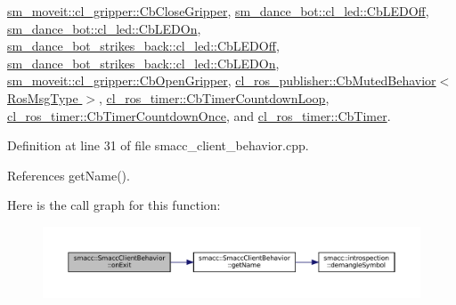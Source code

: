 \hyperlink{classsm__moveit_1_1cl__gripper_1_1CbCloseGripper_a643cca41b7a62a3c2b26e07ab7edb05a}{sm\+\_\+moveit\+::cl\+\_\+gripper\+::\+Cb\+Close\+Gripper}, \hyperlink{classsm__dance__bot_1_1cl__led_1_1CbLEDOff_ad0db28985308dd486943d1f511c655ad}{sm\+\_\+dance\+\_\+bot\+::cl\+\_\+led\+::\+Cb\+L\+E\+D\+Off}, \hyperlink{classsm__dance__bot_1_1cl__led_1_1CbLEDOn_a60a82058c585b4d0398b531c1e1bdf0b}{sm\+\_\+dance\+\_\+bot\+::cl\+\_\+led\+::\+Cb\+L\+E\+D\+On}, \hyperlink{classsm__dance__bot__strikes__back_1_1cl__led_1_1CbLEDOff_a6b4ac6e1c516ced8515e6b6641c5d063}{sm\+\_\+dance\+\_\+bot\+\_\+strikes\+\_\+back\+::cl\+\_\+led\+::\+Cb\+L\+E\+D\+Off}, \hyperlink{classsm__dance__bot__strikes__back_1_1cl__led_1_1CbLEDOn_aadafa99cd7c683a9d1ae59b5158826d9}{sm\+\_\+dance\+\_\+bot\+\_\+strikes\+\_\+back\+::cl\+\_\+led\+::\+Cb\+L\+E\+D\+On}, \hyperlink{classsm__moveit_1_1cl__gripper_1_1CbOpenGripper_a16cdbe39be1b1789880bae04fa87531c}{sm\+\_\+moveit\+::cl\+\_\+gripper\+::\+Cb\+Open\+Gripper}, \hyperlink{classcl__ros__publisher_1_1CbMutedBehavior_a4c02187c58358fa811777d9956510222}{cl\+\_\+ros\+\_\+publisher\+::\+Cb\+Muted\+Behavior$<$ Ros\+Msg\+Type $>$}, \hyperlink{classcl__ros__timer_1_1CbTimerCountdownLoop_a5623e9fdd8f0fb23e8707f7816c099d6}{cl\+\_\+ros\+\_\+timer\+::\+Cb\+Timer\+Countdown\+Loop}, \hyperlink{classcl__ros__timer_1_1CbTimerCountdownOnce_ab602b778a299b42e8cc9f4bf3da0a234}{cl\+\_\+ros\+\_\+timer\+::\+Cb\+Timer\+Countdown\+Once}, and \hyperlink{classcl__ros__timer_1_1CbTimer_a04184e2679c32363c876e1d6b4746072}{cl\+\_\+ros\+\_\+timer\+::\+Cb\+Timer}.



Definition at line 31 of file smacc\+\_\+client\+\_\+behavior.\+cpp.



References get\+Name().


Here is the call graph for this function\+:
\nopagebreak
\begin{figure}[H]
\begin{center}
\leavevmode
\includegraphics[width=350pt]{classsmacc_1_1SmaccClientBehavior_ac0cd72d42bd00425362a97c9803ecce5_cgraph}
\end{center}
\end{figure}
\mbox{\label{classsmacc_1_1SmaccClientBehavior_ab29b23145ea074ad69340fc0af6fbb75}} 
